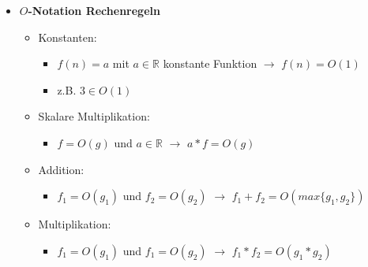 \documentclass[
    12pt,
    a4paper,
    ngerman,
    color=3b,%
    marginpar=false,
    colorback=false,
    leqno,
]{tudaexercise}
\begin{document}
\begin{itemize}
    \item \textbf{$O$-Notation Rechenregeln}
          \begin{itemize}
              \item Konstanten:
                    \begin{itemize}
                        \item $f(n) = a$ mit $a \in \mathbb{R}$ konstante Funktion $\rightarrow$ $f(n) = O(1)$
                        \item z.B. $3 \in O(1)$
                    \end{itemize}

              \item Skalare Multiplikation:
                    \begin{itemize}
                        \item $f= O(g)$ und $a \in \mathbb{R}$ $\rightarrow$ $a*f = O(g)$
                    \end{itemize}

              \item Addition:
                    \begin{itemize}
                        \item $f_1 = O(g_1)$ und $f_2 = O(g_2)$ $\rightarrow$ $f_1+f_2= O(max\{g_1,g_2\})$
                    \end{itemize}

              \item Multiplikation:
                    \begin{itemize}
                        \item $f_1 = O(g_1)$ und $f_1 = O(g_2)$ $\rightarrow$ $f_1*f_2= O(g_1*g_2)$
                    \end{itemize}
          \end{itemize}

          \pagebreak


\end{itemize}
\end{document}
